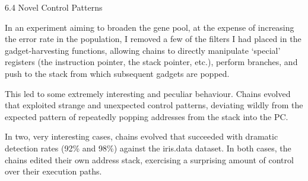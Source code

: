 \documentclass[9pt]{beamer}
\begin{document}
\begin{frame}{6.4 Novel Control Patterns}


In an experiment aiming to broaden the gene pool, at the expense of increasing the error rate in the population, I removed a few of the filters I had placed in the gadget-harvesting functions, allowing chains to directly manipulate `special' registers (the instruction pointer, the stack pointer, etc.), perform branches, and push to the stack from which subsequent gadgets are popped. 

\vspace{.5cm}

This led to some extremely interesting and peculiar behaviour. Chains evolved that exploited strange and unexpected control patterns, deviating wildly from the expected pattern of repeatedly popping addresses from the stack into the PC.

\vspace{.5cm}

In two, very interesting cases, chains evolved that succeeded with dramatic detection rates (92\% and 98\%) against the iris.data dataset. In both cases, the chains edited their own address stack, exercising a surprising amount of control over their execution paths. 

\end{frame}
\end{document}
